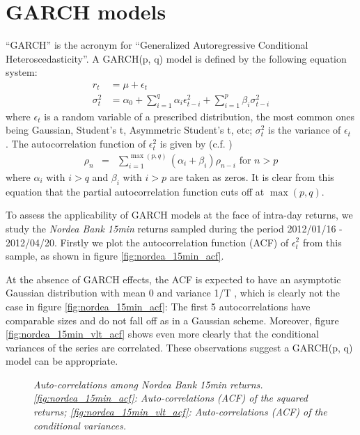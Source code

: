 \section{GARCH models} \label{sec:Garch_model}
``GARCH'' is the acronym for ``Generalized Autoregressive Conditional
Heteroscedasticity''. A GARCH(p, q) model is defined by the following
equation system:
\begin{equation}
  \label{eq:garch_def}
  \begin{aligned}
    r_t &= \mu + \epsilon_t \\
    \sigma_t^2 &= \alpha_0 + \sum_{i=1}^q \alpha_i \epsilon_{t-i}^2 +
    \sum_{i=1}^p \beta_i \sigma_{t-i}^2
  \end{aligned}
\end{equation}
where $\epsilon_t$ is a random variable of a prescribed distribution,
the most common ones being Gaussian, Student's t, Asymmetric Student's
t, etc; $\sigma_t^2$ is the variance of $\epsilon_t$
\cite{Bollerslev86}. The autocorrelation function of $\epsilon_t^2$ is
given by (c.f. \cite{Bollerslev87})
\begin{eqnarray*}
\rho_n &=& \sum_{i=1} ^{\max(p, q)} (\alpha_i + \beta_i) \rho_{n-i}
\text{ for $n > p$}
\end{eqnarray*}
where $\alpha_i$ with $i > q$ and $\beta_i$ with $i > p$ are taken as
zeros. It is clear from this equation that the partial autocorrelation
function cuts off at $\max(p, q)$.

To assess the applicability of GARCH models at the face of intra-day
returns, we study the {\it Nordea Bank 15min} returns sampled during
the period 2012/01/16 - 2012/04/20. Firstly we plot the autocorrelation
function (ACF) of $\epsilon_t^2$ from this sample, as shown
in figure \ref{fig:nordea_15min_acf}.

At the absence of GARCH effects, the ACF is expected to have an
asymptotic Gaussian distribution with mean 0 and variance 1/T
\cite{Bollerslev86, Bollerslev87}, which is clearly not the case in
figure \ref{fig:nordea_15min_acf}: The first 5 autocorrelations have
comparable sizes and do not fall off as in a Gaussian
scheme. Moreover, figure \ref{fig:nordea_15min_vlt_acf} shows 
even more clearly that the conditional variances of the series are
correlated. These observations suggest a GARCH(p, q) model can be
appropriate.

\begin{figure}[htb!]
  \centering
  \caption{\small \it Auto-correlations among Nordea Bank 15min
    returns. \ref{fig:nordea_15min_acf}: Auto-correlations (ACF) of the
    squared returns; \ref{fig:nordea_15min_vlt_acf}: Auto-correlations
    (ACF) of the conditional variances.}
\end{figure}

